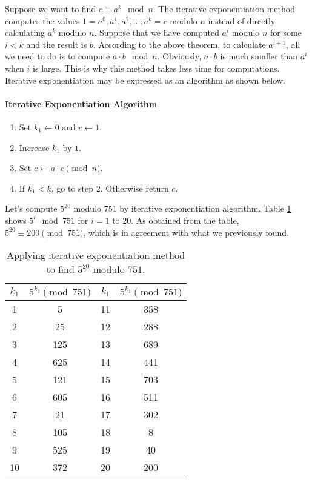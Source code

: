 \documentclass{subfile}
\begin{document}
	Suppose we want to find $c \equiv a^k \mod n$. The iterative exponentiation method computes the values $1=a^0, a^1, a^2, \ldots, a^k=c$ modulo $n$ instead of directly calculating $a^k$ modulo $n$. Suppose that we have computed $a^i$ modulo $n$ for some $i<k$ and the result is $b$. According to the above theorem, to calculate $a^{i+1}$, all we need to do is to compute $a\cdot b \mod n$. Obviously, $a \cdot b$ is much smaller than $a^i$ when $i$ is large. This is why this method takes less time for computations. Iterative exponentiation may be expressed as an algorithm as shown below.
	
	\paragraph{Iterative Exponentiation Algorithm}
	\begin{enumerate}[1.]
		\item Set $k_1 \longleftarrow 0$ and $c \longleftarrow 1$.
		\item Increase $k_1$ by $1$.
		\item Set $c \longleftarrow a \cdot c \pmod n$.
		\item If $k_1<k$, go to step $2$. Otherwise return $c$.
	\end{enumerate}
	
	\begin{example}
		Let's compute $5^{20}$ modulo $751$ by iterative exponentiation algorithm. Table \ref{table:modmult} shows $5^i \mod{751}$ for $i=1$ to $20$. As obtained from the table, $5^{20} \equiv 200 \pmod{751}$, which is in agreement with what we previously found.
		\begin{table}
			\centering
			\begin{tabular}{|c|c|c|c|} 
				\hline 
				$k_1$ & $5^{k_1} \pmod{751}$ & $k_1$ & $5^{k_1} \pmod{751}$ \\ 
				\hline 
				1 & 5 & 11 & 358  \\ 
				\hline 
				2 & 25 & 12 & 288 \\ 
				\hline 
				3 & 125 & 13 & 689 \\ 
				\hline 
				4 & 625 & 14 & 441  \\ 
				\hline 
				5 & 121 & 15 & 703 \\ 
				\hline 
				6 & 605 & 16 & 511 \\ 
				\hline 
				7 & 21 & 17 & 302 \\ 
				\hline 
				8 & 105 & 18 & 8 \\ 
				\hline 
				9 & 525 & 19 & 40 \\ 
				\hline 
				10 & 372 & 20 & 200 \\ 
				\hline 
			\end{tabular} 
			\caption{Applying iterative exponentiation method to find $5^{20}$ modulo $751$.}
			\label{table:modmult}
		\end{table}
	\end{example}
	
\end{document}

